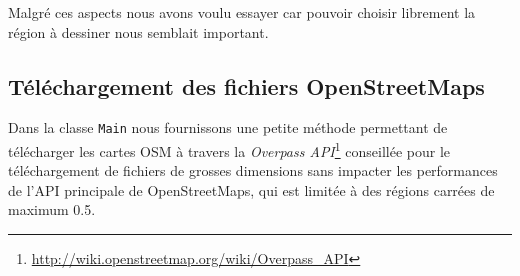 \documentclass[11pt,a4paper]{article}
\begin{document}
Malgré ces aspects nous avons voulu essayer car pouvoir choisir librement la région à dessiner nous semblait important.

\subsection{Téléchargement des fichiers OpenStreetMaps}
Dans la classe \texttt{Main} nous fournissons une petite méthode permettant de télécharger les cartes OSM à travers la \textit{Overpass API}\footnote{\url{http://wiki.openstreetmap.org/wiki/Overpass_API}} conseillée pour le téléchargement de fichiers de grosses dimensions sans impacter les performances de l'API principale de OpenStreetMaps, qui est limitée à des régions carrées de maximum 0.5\degre.
\end{document}
